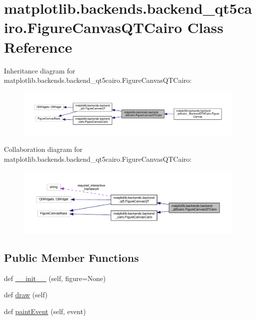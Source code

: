 \hypertarget{classmatplotlib_1_1backends_1_1backend__qt5cairo_1_1FigureCanvasQTCairo}{}\section{matplotlib.\+backends.\+backend\+\_\+qt5cairo.\+Figure\+Canvas\+Q\+T\+Cairo Class Reference}
\label{classmatplotlib_1_1backends_1_1backend__qt5cairo_1_1FigureCanvasQTCairo}


Inheritance diagram for matplotlib.\+backends.\+backend\+\_\+qt5cairo.\+Figure\+Canvas\+Q\+T\+Cairo\+:
\nopagebreak
\begin{figure}[H]
\begin{center}
\leavevmode
\includegraphics[width=350pt]{classmatplotlib_1_1backends_1_1backend__qt5cairo_1_1FigureCanvasQTCairo__inherit__graph}
\end{center}
\end{figure}


Collaboration diagram for matplotlib.\+backends.\+backend\+\_\+qt5cairo.\+Figure\+Canvas\+Q\+T\+Cairo\+:
\nopagebreak
\begin{figure}[H]
\begin{center}
\leavevmode
\includegraphics[width=350pt]{classmatplotlib_1_1backends_1_1backend__qt5cairo_1_1FigureCanvasQTCairo__coll__graph}
\end{center}
\end{figure}
\subsection*{Public Member Functions}
\begin{DoxyCompactItemize}
\item 
def \hyperlink{classmatplotlib_1_1backends_1_1backend__qt5cairo_1_1FigureCanvasQTCairo_abe289fa9b9b55d209eed0585c61e7622}{\+\_\+\+\_\+init\+\_\+\+\_\+} (self, figure=None)
\item 
def \hyperlink{classmatplotlib_1_1backends_1_1backend__qt5cairo_1_1FigureCanvasQTCairo_a703809b6c0898c2787c1dc37f8c9acd0}{draw} (self)
\item 
def \hyperlink{classmatplotlib_1_1backends_1_1backend__qt5cairo_1_1FigureCanvasQTCairo_acaef1b2135550065a334c1882b3ffb6e}{paint\+Event} (self, event)
\end{DoxyCompactItemize}

